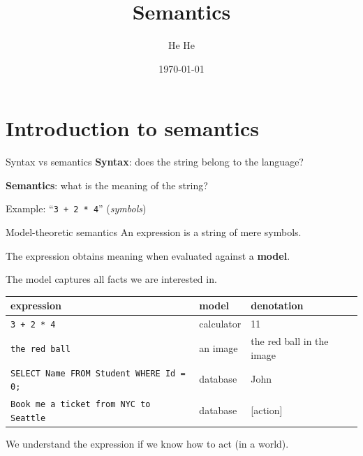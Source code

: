 \documentclass[usenames,dvipsnames,notes]{beamer}
\title[CSCI-GA.2590]{Semantics}
\author[He He]{He He
}
\institute[NYU]{New York University}
\date{\today}
\begin{document}
\begin{frame}
\titlepage
\end{frame}

\section{Introduction to semantics}

\begin{frame}
    {Syntax vs semantics}
    \textbf{Syntax}: does the string belong to the language?

    \textbf{Semantics}: what is the meaning of the string?

    Example: ``\texttt{3 + 2 * 4}'' (\emph{symbols})

    \vspace{7em}
\end{frame}

\begin{frame}
    {Model-theoretic semantics}
    An expression is a string of mere symbols.

    The expression obtains meaning when evaluated against a \textbf{model}.

    The model captures all facts we are interested in.

    \begin{table}
        \begin{tabular}{p{5cm}ll}
            expression & model & denotation \\
            \midrule
            \texttt{3 + 2 * 4} & calculator & 11 \\
            \texttt{the red ball} & an image & the red ball in the image \\
            \texttt{SELECT Name FROM Student WHERE Id = 0;} & database & John \\
            \texttt{Book me a ticket from NYC to Seattle} & database & [action] \\
        \end{tabular}
    \end{table}

    We understand the expression if we know how to act (in a world).
\end{frame}
\end{document}

